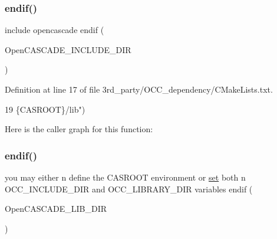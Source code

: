 \subsubsection{\texorpdfstring{endif()}{endif()}\hspace{0.1cm}{\footnotesize\ttfamily [1/3]}}
{\footnotesize\ttfamily include opencascade endif (\begin{DoxyParamCaption}\item[{N\+OT D\+E\+F\+I\+N\+ED}]{Open\+C\+A\+S\+C\+A\+D\+E\+\_\+\+I\+N\+C\+L\+U\+D\+E\+\_\+\+D\+IR }\end{DoxyParamCaption})}



Definition at line 17 of file 3rd\+\_\+party/\+O\+C\+C\+\_\+dependency/\+C\+Make\+Lists.\+txt.


\begin{DoxyCode}
19                                          \{CASROOT\}/lib\textcolor{stringliteral}{")}
\end{DoxyCode}
Here is the caller graph for this function\+:
\mbox{\label{3rd__party_2OCC__dependency_2CMakeLists_8txt_a3ffaea3e0c800aef2ee51b0e82b6ff89}} 
\subsubsection{\texorpdfstring{endif()}{endif()}\hspace{0.1cm}{\footnotesize\ttfamily [2/3]}}
{\footnotesize\ttfamily you may either n define the C\+A\+S\+R\+O\+OT environment or \hyperlink{3rd__party_2OCC__dependency_2CMakeLists_8txt_a074553c33956a239810d7affac62c071}{set} both n O\+C\+C\+\_\+\+I\+N\+C\+L\+U\+D\+E\+\_\+\+D\+IR and O\+C\+C\+\_\+\+L\+I\+B\+R\+A\+R\+Y\+\_\+\+D\+IR variables endif (\begin{DoxyParamCaption}\item[{N\+OT D\+E\+F\+I\+N\+ED Open\+C\+A\+S\+C\+A\+D\+E\+\_\+\+I\+N\+C\+L\+U\+D\+E\+\_\+\+D\+IR OR N\+OT D\+E\+F\+I\+N\+ED}]{Open\+C\+A\+S\+C\+A\+D\+E\+\_\+\+L\+I\+B\+\_\+\+D\+IR }\end{DoxyParamCaption})}



